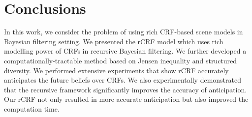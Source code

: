 
\section{Conclusions}

In this work, we consider the problem of using rich \mbox{CRF-based} scene models in Bayesian filtering setting. We presented the rCRF model which uses rich modelling power of CRFs in recursive Bayesian filtering. We further developed a computationally-tractable method based on Jensen inequality and structured diversity. We performed extensive experiments that
show rCRF  accurately anticipates the future beliefs over CRFs. We also experimentally demonstrated that the recursive framework significantly improves the accuracy of anticipation. Our rCRF not only resulted in more accurate anticipation but also improved the computation time.   
